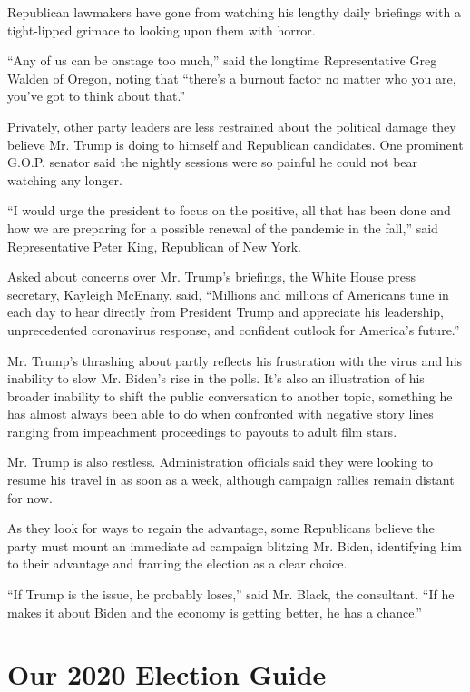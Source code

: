 Republican lawmakers have gone from watching his lengthy daily briefings
with a tight-lipped grimace to looking upon them with horror.

``Any of us can be onstage too much,'' said the longtime Representative
Greg Walden of Oregon, noting that ``there's a burnout factor no matter
who you are, you've got to think about that.''

Privately, other party leaders are less restrained about the political
damage they believe Mr. Trump is doing to himself and Republican
candidates. One prominent G.O.P. senator said the nightly sessions were
so painful he could not bear watching any longer.

``I would urge the president to focus on the positive, all that has been
done and how we are preparing for a possible renewal of the pandemic in
the fall,'' said Representative Peter King, Republican of New York.

Asked about concerns over Mr. Trump's briefings, the White House press
secretary, Kayleigh McEnany, said, ``Millions and millions of Americans
tune in each day to hear directly from President Trump and appreciate
his leadership, unprecedented coronavirus response, and confident
outlook for America's future.''

Mr. Trump's thrashing about partly reflects his frustration with the
virus and his inability to slow Mr. Biden's rise in the polls. It's also
an illustration of his broader inability to shift the public
conversation to another topic, something he has almost always been able
to do when confronted with negative story lines ranging from impeachment
proceedings to payouts to adult film stars.

Mr. Trump is also restless. Administration officials said they were
looking to resume his travel in as soon as a week, although campaign
rallies remain distant for now.

As they look for ways to regain the advantage, some Republicans believe
the party must mount an immediate ad campaign blitzing Mr. Biden,
identifying him to their advantage and framing the election as a clear
choice.

``If Trump is the issue, he probably loses,'' said Mr. Black, the
consultant. ``If he makes it about Biden and the economy is getting
better, he has a chance.''

\hypertarget{our-2020-election-guide}{%
\section{Our 2020 Election Guide}\label{our-2020-election-guide}}

